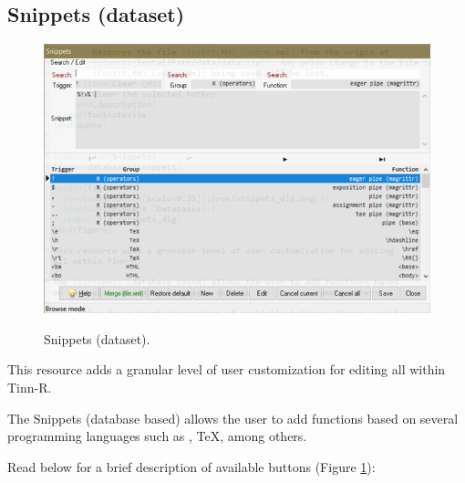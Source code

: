 \subsection{Snippets (dataset)}

\begin{figure}[H]
  \includegraphics[scale=0.35]{./res/dlg_snippets.png}\\
  \caption{Snippets (dataset).}
  \label{fig:dlg_snippets}
\end{figure}

This resource adds a granular level of user customization for editing
all within Tinn-R.

The Snippets (database based) allows the user to add functions based
on several programming languages such as \RR{}, \TeX, among others.

Read below for a brief description of available buttons (Figure \ref{fig:dlg_snippets}):

